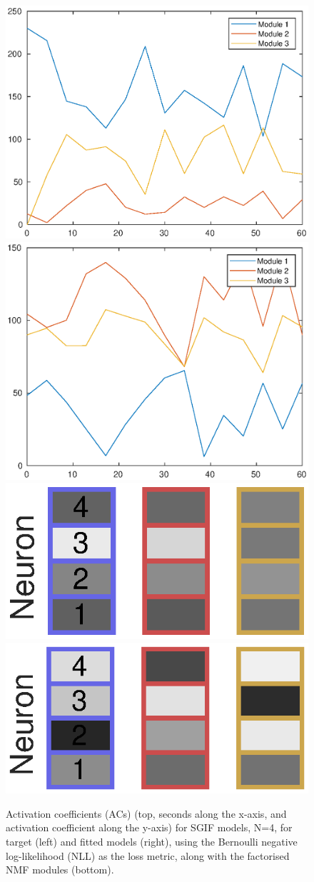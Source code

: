 \documentclass[mphil,deptreport,ianc]{infthesis} %
\begin{document}
\begin{figure}
    \includegraphics[width=0.49\columnwidth]{figures/matlab/NMF/ACs_target_GT_model_mesoGIF_N_4.eps}
    \includegraphics[width=0.49\columnwidth]{figures/matlab/NMF/ACs_nuovo_spikes_mt_microGIF_euid_12-09_16-02-03-400_lfn_bernoulli_nll.eps}
    \centering
    \includegraphics[width=0.3\columnwidth]{figures/matlab/NMF/target_GT_model_mesoGIF_N_4.eps}
    \includegraphics[width=0.3\columnwidth]{figures/matlab/NMF/modules_nuovo_spikes_mt_microGIF_euid_12-09_16-02-03-400_lfn_bernoulli_nll_4.eps}
    \caption{Activation coefficients (ACs) (top, seconds along the x-axis, and activation coefficient along the y-axis) for SGIF models, N=4, for target (left) and fitted models (right), using the Bernoulli negative log-likelihood (NLL) as the loss metric, along with the factorised NMF modules (bottom).}
\end{figure}
\end{document}
